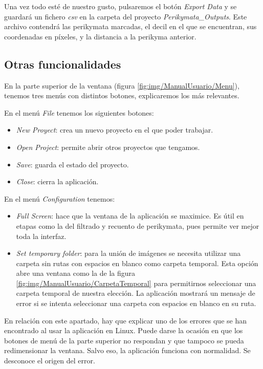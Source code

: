 
Una vez todo esté de nuestro gusto, pulsaremos el botón \textit{Export Data} y se guardará un fichero \textit{csv} en la carpeta del proyecto \textit{Perikymata\_Outputs}. Este archivo contendrá las perikymata marcadas, el decil en el que se encuentran, sus coordenadas en píxeles, y la distancia a la perikyma anterior.

\subsection{Otras funcionalidades}
En la parte superior de la ventana (figura \ref{fig:img/ManualUsuario/Menu}), tenemos tres menús con distintos botones, explicaremos los más relevantes.

En el menú \textit{File} tenemos los siguientes botones:
\begin{itemize}
    \item \textit{New Proyect}: crea un nuevo proyecto en el que poder trabajar.
    \item \textit{Open Project}: permite abrir otros proyectos que tengamos.
    \item \textit{Save}: guarda el estado del proyecto.
    \item \textit{Close}: cierra la aplicación.
\end{itemize}

En el menú \textit{Configuration} tenemos:
\begin{itemize}
     \item \textit{Full Screen}: hace que la ventana de la aplicación se maximice. Es útil en etapas como la del filtrado y recuento de perikymata, pues permite ver mejor toda la interfaz.
      \item \textit{Set temporary folder}: para la unión de imágenes se necesita utilizar una carpeta sin rutas con espacios en blanco como carpeta temporal. Esta opción abre una ventana como la de la figura \ref{fig:img/ManualUsuario/CarpetaTemporal} para permitirnos seleccionar una carpeta temporal de nuestra elección. La aplicación mostrará un mensaje de error si se intenta seleccionar una carpeta con espacios en blanco en su ruta.
      
\end{itemize}

En relación con este apartado, hay que explicar uno de los errores que se han encontrado al usar la aplicación en Linux. Puede darse la ocasión en que los botones de menú de la parte superior no respondan y que tampoco se pueda redimensionar la ventana. Salvo eso, la aplicación funciona con normalidad. Se desconoce el origen del error.



